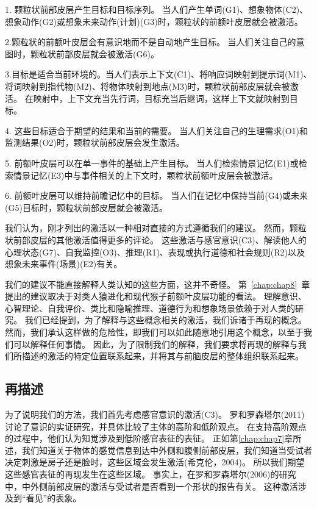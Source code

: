1. 颗粒状前部皮层产生目标和目标序列。
当人们产生单词(G1)、想象物体(C2)、想象动作(G2)或想象未来动作(计划)(G3)时，颗粒状的前额叶皮层就会被激活。


2.颗粒状的前额叶皮层会有意识地而不是自动地产生目标。
当人们关注自己的意图时，颗粒状前部皮层就会被激活(G6)。


3.目标是适合当前环境的。当人们表示上下文(C1)、将响应词映射到提示词(M1)、将词映射到指代物(M2)、将物体映射到地点(M3)时，颗粒状前部皮层就会被激活。
在映射中，上下文充当先行词，目标充当后继词，这样上下文就映射到目标。


4. 这些目标适合于期望的结果和当前的需要。
当人们关注自己的生理需求(O1)和监测结果(O2)时，颗粒状前部皮层会发生激活。


5. 前额叶皮层可以在单一事件的基础上产生目标。
当人们检索情景记忆(E1)或检索情景记忆(E3)中与事件相关的上下文时，颗粒状前额叶皮层会被激活。


6. 前额叶皮层可以维持前瞻记忆中的目标。
当人们在记忆中保持当前(G4)或未来(G5)目标时，颗粒状前部皮层就会被激活。


我们认为，刚才列出的激活以一种相对直接的方式遵循我们的建议。
然而，颗粒状前部皮层的其他激活值得更多的评论。
这些激活与感官意识(C3)、解读他人的心理状态(G7)、自我监控(O3)、推理(R1)、表现或执行道德和社会规则(R2)以及想象未来事件(场景)(E2)有关。


我们的建议不能直接解释人类认知的这些方面，这并不奇怪。
第~\ref{chap:chap8}~章提出的建议取决于对类人猿进化和现代猴子前额叶皮层功能的看法。
理解意识、心智理论、自我评价、类比和隐喻推理、道德行为和想象场景依赖于对人类的研究。
我们已经提到，为了解释与这些概念相关的激活，我们诉诸于再现的概念。
然而，我们承认这样做的危险性，即我们可以如此随意地引用这个概念，以至于我们可以解释任何事情。
因此，为了限制我们的解释，我们要求将再现的解释与我们所描述的激活的特定位置联系起来，并将其与前脑皮层的整体组织联系起来。



\subsection{再描述}

为了说明我们的方法，我们首先考虑感官意识的激活(C3)。
罗和罗森塔尔(2011)讨论了意识的实证研究，并具体比较了主体的高阶和低阶观点。
在支持高阶观点的过程中，他们认为知觉涉及到低阶感官表征的表征。
正如第\ref{chap:chap7}章所述，我们知道关于物体的感觉信息到达中外侧和腹侧前部皮层，我们知道当受试者决定刺激是房子还是脸时，这些区域会发生激活(希克伦，2004)。
所以我们期望这些感官表征的再现发生在这些区域。
事实上，在罗和罗森塔尔(2006)的研究中，中外侧前部皮层的激活与受试者是否看到一个形状的报告有关。
这种激活涉及到“看见”的表象。



